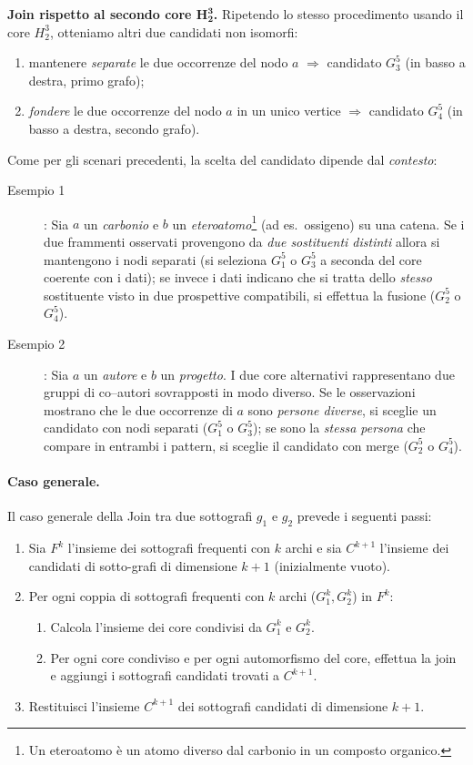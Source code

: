 \noindent\textbf{Join rispetto al secondo core $\mathbf{H_2^3}$.}
Ripetendo lo stesso procedimento usando il core $H_2^3$, otteniamo altri due candidati non isomorfi:
\begin{enumerate}
    \item mantenere \emph{separate} le due occorrenze del nodo $a$ $\Rightarrow$ candidato $G_3^5$ (in basso a destra, primo grafo);
    \item \emph{fondere} le due occorrenze del nodo $a$ in un unico vertice $\Rightarrow$ candidato $G_4^5$ (in basso a destra, secondo grafo).
\end{enumerate}

\medskip
\noindent
Come per gli scenari precedenti, la scelta del candidato dipende dal \emph{contesto}:
\begin{description}
    \item[Esempio 1]: Sia $a$ un \emph{carbonio} e $b$ un \emph{eteroatomo}\footnote{Un eteroatomo è un atomo diverso dal carbonio in un composto organico.} (ad es.\ ossigeno) su una catena. Se i due frammenti osservati provengono da \emph{due sostituenti distinti} allora si mantengono i nodi separati (si seleziona $G_1^5$ o $G_3^5$ a seconda del core coerente con i dati); se invece i dati indicano che si tratta dello \emph{stesso} sostituente visto in due prospettive compatibili, si effettua la fusione ($G_2^5$ o $G_4^5$).
    \item[Esempio 2]: Sia $a$ un \emph{autore} e $b$ un \emph{progetto}. I due core alternativi rappresentano due gruppi di co–autori sovrapposti in modo diverso. Se le osservazioni mostrano che le due occorrenze di $a$ sono \emph{persone diverse}, si sceglie un candidato con nodi separati ($G_1^5$ o $G_3^5$); se sono la \emph{stessa persona} che compare in entrambi i pattern, si sceglie il candidato con merge ($G_2^5$ o $G_4^5$).
\end{description}

\paragraph{Caso generale.}
Il caso generale della Join tra due sottografi $g_1$ e $g_2$ prevede i seguenti passi:
\begin{enumerate}
    \item Sia $F^k$ l'insieme dei sottografi frequenti con $k$ archi e sia $C^{k+1}$ l'insieme dei candidati di sotto-grafi di dimensione $k+1$ (inizialmente vuoto).
    \item Per ogni coppia di sottografi frequenti con $k$ archi ($G_1^k, G_2^k$) in $F^k$:
    \begin{enumerate}
        \item Calcola l'insieme dei core condivisi da $G_1^k$ e $G_2^k$.
        \item Per ogni core condiviso e per ogni automorfismo del core, effettua la join e aggiungi i sottografi candidati trovati a $C^{k+1}$.
    \end{enumerate}
    \item Restituisci l'insieme $C^{k+1}$ dei sottografi candidati di dimensione $k+1$.
\end{enumerate}

